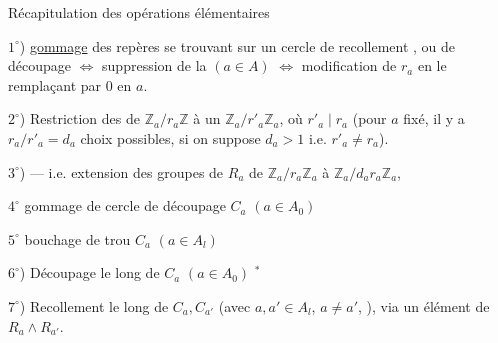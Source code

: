 
Récapitulation des opérations élémentaires


$1^\circ$) \uline{gommage}  des repères se trouvant sur un cercle  de recollement , ou  de découpage
$\Longleftrightarrow$ suppression de la  
$(a\in A)$ $\Longleftrightarrow$ modification de $r_a$ en le
remplaçant par $0$ en $a$.

$2^\circ$) 
Restriction des   de $\mathbb Z_a/r_a\mathbb Z$ à un
$\mathbb Z_a/r'_a\mathbb Z_a$, où $r'_a\mid r_a$
(pour $a$ fixé, il y a $r_a/r'_a=d_a$ choix possibles, si on suppose $d_a>1$ i.e. $r'_a\ne r_a$).

$3^\circ$) 
--- i.e. extension des groupes de $R_a$ de
$\mathbb Z_a/r_a\mathbb Z_a$ à $\mathbb Z_a/d_ar_a\mathbb Z_a$,

\textcircled{$4^\circ$} gommage de cercle de découpage $C_a$ $(a\in A_0)$

\textcircled{$5^\circ$} bouchage de trou $C_a$ $(a\in A_l)$

$6^\circ$) Découpage le long de $C_a$ $(a\in A_0)$ \({}^*\)

$7^\circ$) Recollement le long de $C_a,C_{a'}$
(avec $a,a'\in A_l$, $a\ne a'$, ), via un élément de
$R_a\mathbin{\wedge}R_{a'}$.

